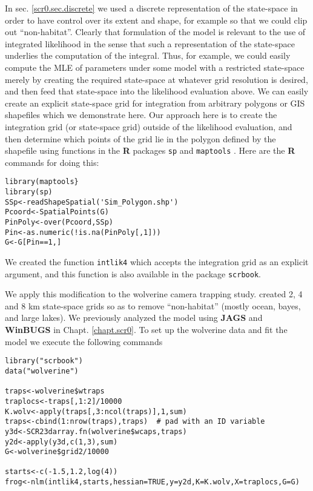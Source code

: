 {In sec. \ref{scr0.sec.discrete} 
 we used a discrete representation of
the state-space in order to have control over its extent and shape,
for example so that we could clip out ``non-habitat''. Clearly that
formulation of the model is relevant to the use of integrated
likelihood in the sense that such a representation of the state-space
underlies the computation of the integral. Thus, for example, we could
easily compute the MLE of parameters under some model with a
restricted state-space merely by creating the required state-space at
whatever grid resolution is desired, and then feed that state-space
into the likelihood evaluation above. We can easily create an explicit
state-space grid for integration from arbitrary polygons or GIS
shapefiles  which we 
demonstrate here. Our approach here is to create the integration grid
(or state-space grid) outside of the likelihood evaluation, and then
determine which points of the grid lie in the polygon defined by the
shapefile using 
functions in the {\bf R} packages \mbox{\tt sp}  and
\mbox{\tt maptools}  .  Here
are the {\bf R} commands for doing this:  
{\small
\begin{verbatim}
library(maptools}
library(sp)
SSp<-readShapeSpatial('Sim_Polygon.shp')
Pcoord<-SpatialPoints(G)
PinPoly<-over(Pcoord,SSp)
Pin<-as.numeric(!is.na(PinPoly[,1]))
G<-G[Pin==1,]
\end{verbatim}
}
We created  the function \mbox{\tt intlik4} which accepts the integration
grid as an explicit argument, and this function is also available in
the package  \mbox{\tt scrbook}.

We apply this modification to the wolverine camera trapping
study. \citet{royle_etal:2011jwm} created 2, 4 and 8 km state-space
grids so as to remove ``non-habitat'' (mostly ocean, bayes, and large
lakes). We previously analyzed the model using {\bf JAGS} and {\bf WinBUGS} in
Chapt. \ref{chapt.scr0}.  To set up the wolverine data and fit the
model we execute the following commands
{\small 
\begin{verbatim}
library("scrbook")
data("wolverine")

traps<-wolverine$wtraps
traplocs<-traps[,1:2]/10000
K.wolv<-apply(traps[,3:ncol(traps)],1,sum)
traps<-cbind(1:nrow(traps),traps)  # pad with an ID variable
y3d<-SCR23darray.fn(wolverine$wcaps,traps)
y2d<-apply(y3d,c(1,3),sum)
G<-wolverine$grid2/10000

starts<-c(-1.5,1.2,log(4))
frog<-nlm(intlik4,starts,hessian=TRUE,y=y2d,K=K.wolv,X=traplocs,G=G)


\end{verbatim}}}
